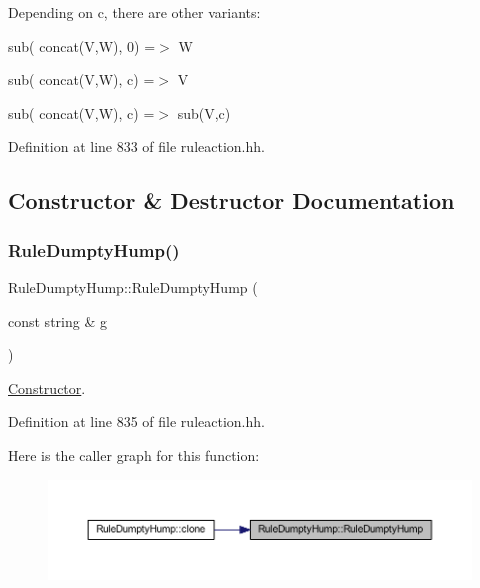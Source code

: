 Depending on c, there are other variants\+:
\begin{DoxyItemize}
\item {\ttfamily sub( concat(\+V,\+W), 0) =$>$ W}
\item {\ttfamily sub( concat(\+V,\+W), c) =$>$ V}
\item {\ttfamily sub( concat(\+V,\+W), c) =$>$ sub(\+V,c)} 
\end{DoxyItemize}

Definition at line 833 of file ruleaction.\+hh.



\subsection{Constructor \& Destructor Documentation}
\mbox{\label{class_rule_dumpty_hump_a1f9fd315a38117e6c3f70fdc3956f4f1}} 
\subsubsection{\texorpdfstring{RuleDumptyHump()}{RuleDumptyHump()}}
{\footnotesize\ttfamily Rule\+Dumpty\+Hump\+::\+Rule\+Dumpty\+Hump (\begin{DoxyParamCaption}\item[{const string \&}]{g }\end{DoxyParamCaption})\hspace{0.3cm}{\ttfamily [inline]}}



\mbox{\hyperlink{class_constructor}{Constructor}}. 



Definition at line 835 of file ruleaction.\+hh.

Here is the caller graph for this function\+:
\nopagebreak
\begin{figure}[H]
\begin{center}
\leavevmode
\includegraphics[width=350pt]{class_rule_dumpty_hump_a1f9fd315a38117e6c3f70fdc3956f4f1_icgraph}
\end{center}
\end{figure}


